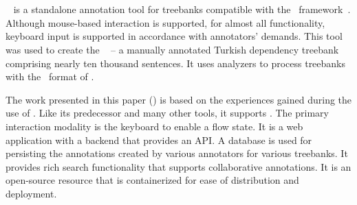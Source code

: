 \section{\boatvone}
\label{sec:boatvone}

\boatvone~\cite{turk-etal-2019-turkish} is a standalone annotation tool for treebanks compatible with the \ud\ framework~\cite{UD}.
Although mouse-based interaction is supported, for almost all functionality, keyboard input is supported in accordance with annotators' demands.
This tool was used to create the \bountreebank~\cite{turk2021resources,UD-Boun-Treebank} -- a manually annotated Turkish dependency treebank comprising nearly ten thousand sentences.
It uses analyzers to process treebanks with the \conllu\ format of \ud.

The work presented in this paper (\boatvtwo) is based on the experiences gained during the use of \boatvone.
Like its predecessor and many other tools, it supports \ud.
The primary interaction modality is the keyboard to enable a flow state.
It is a web application with a backend that provides an API.
A database is used for persisting the annotations created by various annotators for various treebanks.
It provides rich search functionality that supports collaborative annotations.
It is an open-source resource that is containerized for ease of distribution and deployment.
